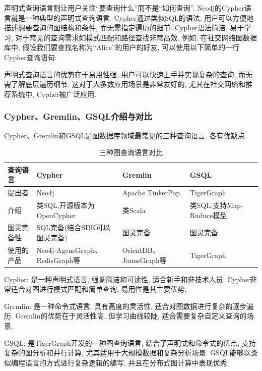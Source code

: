 声明式查询语言则让用户关注“要查询什么”而不是“如何查询”. Neo4j的Cypher语言就是一种典型的声明式查询语言. Cypher通过类似SQL的语法, 用户可以方便地描述想要查询的图结构和条件, 而无需指定遍历的细节. Cypher语法简洁, 易于学习, 对于常见的查询需求如模式匹配和路径查找非常高效. 例如, 在社交网络图数据库中, 假设我们要查找名称为“Alice”的用户的好友, 可以使用以下简单的一行Cypher查询语句:


声明式查询语言的优势在于易用性强, 用户可以快速上手并实现复杂的查询, 而无需了解底层遍历细节. 这对于大多数应用场景是非常友好的, 尤其在社交网络和推荐系统中, Cypher被广泛应用.

\vspace{1cm}
\subsubsection*{Cypher、Gremlin、GSQL介绍与对比}
Cypher、Gremlin和GSQL是图数据库领域最常见的三种查询语言, 各有优缺点.
\begin{table}[htbp]
	\centering
	\caption{三种图查询语言对比}
	\begin{tabularx}{\textwidth}{|X|X|X|X| }
		\hline
		查询语言  & Cypher                       & Gremlin              & GSQL                \\
		\hline
		提出者   & Neo4j                        & Apache TinkerPop     & TigerGraph          \\
		\hline
		介绍    & 类SQL,开源版本为OpenCypher         & 类Scala               & 类SQL,支持Map-Ruduce模型 \\
		\hline
		图灵完备性 & SQL完备(结合SDK可以图灵完备)           & 图灵完备                 & 图灵完备                \\
		\hline
		使用的产品 & Neo4j-AgensGraph、RedisGraph等 & OrientDB、JanusGraph等 & TigerGraph          \\
		\hline
	\end{tabularx}%
	\label{tab:addlabel}%
\end{table}%

Cypher: 是一种声明式语言, 强调简洁和可读性, 适合新手和非技术人员. Cypher非常适合对图进行模式匹配和简单查询, 易用性是其主要优势.

Gremlin: 是一种命令式语言, 具有高度的灵活性, 适合对图数据进行复杂的逐步遍历. Gremlin的优势在于灵活性高, 但学习曲线较陡, 适合需要复杂自定义查询的场景.

GSQL: 是TigerGraph开发的一种图查询语言, 结合了声明式和命令式的优点, 支持复杂的图分析和并行计算, 尤其适用于大规模数据和复杂分析场景. GSQL能够以类似编程语言的方式进行复杂逻辑的编写, 并且在分布式图计算中表现优秀.

